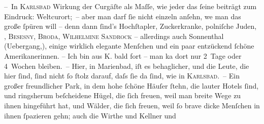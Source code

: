 \pstart
           – In \textsc{Karlsbad} Wirkung der Curgäſte als Maſſe, wie jeder das ſeine beiträgt zum Eindruck:
               Weltcurort; – aber man darf ſie nicht einzeln anſehn, we{\geminationn} man das große ſpüren will – denn dann ſind’s Hochſtapler, Zuckerkranke, polniſche Juden, \label{K_L00462-1v}\label{K_L00462-1}, \textsc{Besesny}, \textsc{Broda}, \textsc{Wilhelmine Sandrock} – allerdings auch Sonnenthal
               (Uebergang,), einige wirklich elegante Menſchen und ein paar entzückend ſchöne
               Amerikanerinnen. – Ich bin aus \textsc{K}. {\pb}bald fort – man ka{\geminationn}
               dort nur 2 Tage oder 4 Wochen bleiben. – Hier, in Marienbad, iſt es behaglicher, und die Leute, die hier ſind, ſind nicht ſo
               ſtolz darauf, daſs ſie da ſind, wie in \textsc{Karlsbad}. – Ein großer freundlicher Park, in dem hohe ſchöne Häuſer ſtehn, die lauter
               Hotels ſind, und ringsherum beſcheidene Hügel, die ſich freuen, weil man breite Wege
               zu ihnen hingeführt hat, und Wälder, die ſich freuen, weil ſo brave dicke Menſchen in
               ihnen ſpazieren gehn; auch die Wirthe und Kellner {\pb}und
